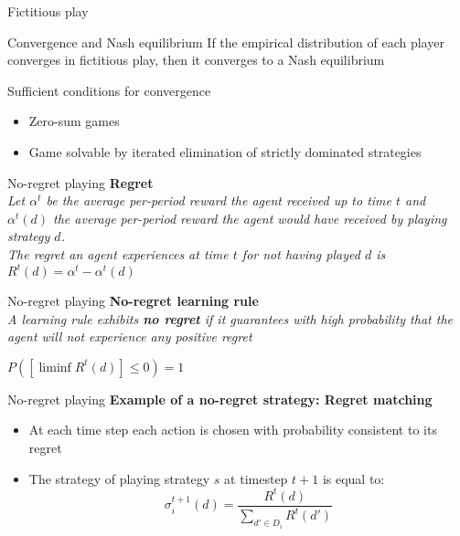 \begin{frame}{Fictitious play}
    \begin{block}{Convergence and Nash equilibrium}
        If the empirical distribution of each player converges in fictitious play, then it converges to a Nash equilibrium
    \end{block}
    \begin{block}{Sufficient conditions for convergence}
        \begin{itemize}
            \item Zero-sum games
            \item Game solvable by iterated elimination of strictly dominated strategies
        \end{itemize}
    \end{block}
\end{frame}


\begin{frame}{No-regret playing}
    \textbf{Regret}\\
    \textit{Let $\alpha^t$ be the average per-period reward the agent received up to time $t$ and $\alpha^t(d)$ the average per-period reward the agent would have received by playing strategy $d$.}\\
    \textit{The regret an agent experiences at time $t$ for not having played $d$ is $R^t(d)=\alpha^t-\alpha^t(d)$}
\end{frame}

\begin{frame}{No-regret playing}
    \textbf{No-regret learning rule}\\
    \textit{A learning rule exhibits \textbf{no regret} if it guarantees with high probability that the agent will not experience any positive regret}
    \begin{center}
        $P([\liminf R^t(d)]\leq 0)=1$
    \end{center}
\end{frame}

\begin{frame}{No-regret playing}
    \textbf{Example of a no-regret strategy: Regret matching}\\
    \begin{itemize}
        \item At each time step each action is chosen with probability consistent to its regret
        \item The strategy of playing strategy $s$ at timestep $t+1$ is equal to:
        \[
            \sigma_i^{t+1}(d)= \frac{R^t(d)}{\sum_{d'\in D_i} R^t(d')}
        \]
    \end{itemize}
\end{frame}

